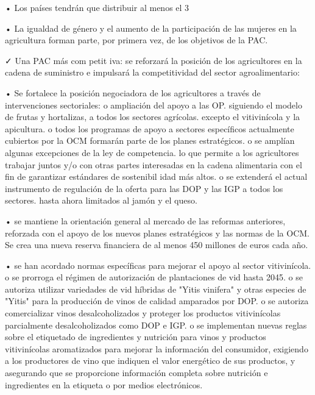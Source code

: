 \documentclass[10pt,a4paper]{article}
\begin{document}
• Los países tendrán que distribuir al menos el 3%

• La igualdad de género y el aumento de la participación de las mujeres en la agricultura forman parte, por primera vez, de los objetivos de la PAC.

✓ Una PAC más com petit iva: se reforzará la posición de los agricultores en la cadena de suministro e impulsará la competitividad del sector agroalimentario: 

• Se fortalece la posición negociadora de los agricultores a través de intervenciones sectoriales: o ampliación del apoyo a las OP. siguiendo el modelo de frutas y hortalizas, a todos los sectores agrícolas. excepto el vitivinícola y la apicultura. o todos los programas de apoyo a sectores específicos actualmente cubiertos por la OCM formarán parte de los planes estratégicos. o se amplían algunas excepciones de la ley de competencia. lo que permite a los agricultores trabajar juntos y/o con otras partes interesadas en la cadena alimentaria con el fin de garantizar estándares de sostenibil idad más altos. o se extenderá el actual instrumento de regulación de la oferta para las DOP y las IGP a todos los sectores. hasta ahora limitados al jamón y el queso.

• se mantiene la orientación general al mercado de las reformas anteriores, reforzada con el apoyo de los nuevos planes estratégicos y las normas de la OCM. Se crea una nueva reserva financiera de al menos 450 millones de euros cada año. 

• se han acordado normas específicas para mejorar el apoyo al sector vitivinícola. o se prorroga el régimen de autorización de plantaciones de vid hasta 2045. o se autoriza utilizar variedades de vid híbridas de "Yitis vinifera" y otras especies de "Yitis" para la producción de vinos de calidad amparados por DOP. o se autoriza comercializar vinos desalcoholizados y proteger los productos vitivinícolas parcialmente desalcoholizados como DOP e IGP. o se implementan nuevas reglas sobre el etiquetado de ingredientes y nutrición para vinos y productos vitivinícolas aromatizados para mejorar la información del consumidor, exigiendo a los productores de vino que indiquen el valor energético de sus productos, y asegurando que se proporcione información completa sobre nutrición e ingredientes en la etiqueta o por medios electrónicos.
\end{document}
